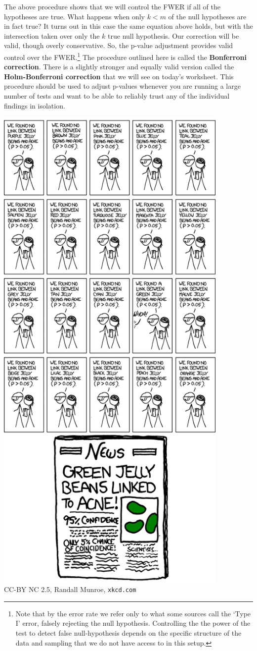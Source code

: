\documentclass{tufte-handout}
\begin{document}
The above procedure shows that we will control the FWER if all of the
hypotheses are true. What happens when only $k < m$ of the null hypotheses
are in fact true? It turns out in this case the same equation above holds,
but with the intersection taken over only the $k$ true null hypothesis. Our
correction will be valid, though overly conservative. So, the p-value adjustment
provides valid control over the FWER.\footnote{
  Note that by the error rate we refer only to what some sources call the
  `Type I' error, falsely rejecting the null hypothesis. Controlling the 
  the power of the test to detect false null-hypothesis depends on the
  specific structure of the data and sampling that we do not have access 
  to in this setup.
} The procedure outlined here is called the \textbf{Bonferroni correction}.
There is a slightly stronger and equally valid version called the
\textbf{Holm-Bonferroni correction} that we will see on today's worksheet.
This procedure should be used to adjust p-values whenever you are running
a large number of tests and want to be able to reliably trust any of the
individual findings in isolation.

\newpage

\begin{center}
\includegraphics[width=0.85\textwidth]{../extra/significant.png} \\
\footnotesize{CC-BY NC 2.5, Randall Munroe, \texttt{xkcd.com}}
\end{center}
\end{document}

